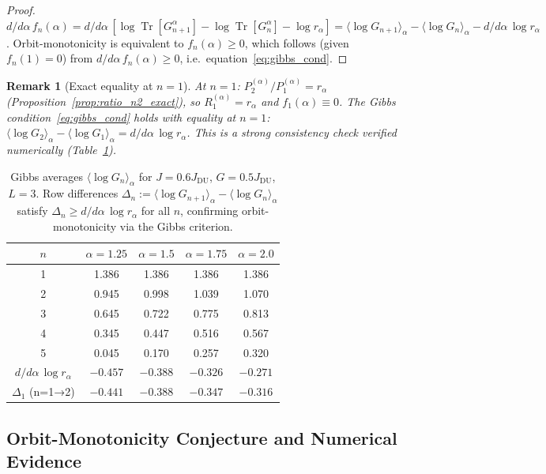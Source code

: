 \documentclass[12pt,a4paper]{article}
\newtheorem{remark}[theorem]{Remark}
\begin{document}
\begin{proof}
$d/d\alpha\,f_n(\alpha) = d/d\alpha\,[\log\operatorname{Tr}[G_{n+1}^\alpha] - \log\operatorname{Tr}[G_n^\alpha]
- \log r_\alpha] = \langle\log G_{n+1}\rangle_\alpha - \langle\log G_n\rangle_\alpha
- d/d\alpha\,\log r_\alpha$.
Orbit-monotonicity is equivalent to $f_n(\alpha)\geq 0$, which follows (given $f_n(1)=0$)
from $d/d\alpha\,f_n(\alpha)\geq 0$, i.e.\ equation~\eqref{eq:gibbs_cond}.
\end{proof}

\begin{remark}[Exact equality at $n=1$]
At $n=1$: $P_2^{(\alpha)}/P_1^{(\alpha)}=r_\alpha$ (Proposition~\ref{prop:ratio_n2_exact}),
so $R_1^{(\alpha)}=r_\alpha$ and $f_1(\alpha)\equiv 0$.
The Gibbs condition~\eqref{eq:gibbs_cond} holds with equality at $n=1$:
$\langle\log G_2\rangle_\alpha - \langle\log G_1\rangle_\alpha = d/d\alpha\,\log r_\alpha$.
This is a strong consistency check verified numerically (Table~\ref{tab:gibbs}).
\end{remark}

\begin{table}[h!]
\centering
\caption{Gibbs averages $\langle\log G_n\rangle_\alpha$ for $J=0.6J_{\mathrm{DU}}$,
$G=0.5J_{\mathrm{DU}}$, $L=3$.
Row differences $\Delta_n:=\langle\log G_{n+1}\rangle_\alpha - \langle\log G_n\rangle_\alpha$
satisfy $\Delta_n\geq d/d\alpha\,\log r_\alpha$ for all $n$,
confirming orbit-monotonicity via the Gibbs criterion.}
\label{tab:gibbs}
\begin{tabular}{c|cccc}
$n$ & $\alpha=1.25$ & $\alpha=1.5$ & $\alpha=1.75$ & $\alpha=2.0$ \\
\hline
1 & 1.386 & 1.386 & 1.386 & 1.386 \\
2 & 0.945 & 0.998 & 1.039 & 1.070 \\
3 & 0.645 & 0.722 & 0.775 & 0.813 \\
4 & 0.345 & 0.447 & 0.516 & 0.567 \\
5 & 0.045 & 0.170 & 0.257 & 0.320 \\
\hline
$d/d\alpha\,\log r_\alpha$ & $-0.457$ & $-0.388$ & $-0.326$ & $-0.271$ \\
$\Delta_1$ (n=1→2) & $-0.441$ & $-0.388$ & $-0.347$ & $-0.316$ \\
\end{tabular}
\end{table}

\subsection{Orbit-Monotonicity Conjecture and Numerical Evidence}
\label{sec:om_conjecture}
\end{document}
